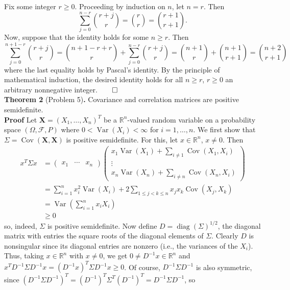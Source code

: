 \documentclass[10pt]{article}
\newcommand{\bs}[1]{\boldsymbol{#1}}
\newcommand{\bp}[1]{\left({#1}\right)}
\newcommand{\mbb}[1]{\mathbb{#1}}
\newcommand{\1}[1]{\mathbbm{1}_{#1}}
\newcommand{\mc}[1]{\mathcal{#1}}
\newcommand{\nck}[2]{{#1\choose#2}}
\DeclareMathOperator{\Var}{Var}
\DeclareMathOperator{\Cov}{Cov}
\DeclareMathOperator{\diag}{diag}
\begin{document}
    \hspace{5pt} Fix some integer $r\geq 0$. Proceeding by induction on $n$, let $n=r$. Then
    \[\sum_{j=0}^{n-r}\nck{r+j}{r}=\nck{r}{r}=\nck{r+1}{r+1}.\]
    Now, suppose that the identity holds for some $n\geq r$. Then
    \[\sum_{j=0}^{n+1-r}\nck{r+j}{r}=\nck{n+1-r+r}{r}+\sum_{j=0}^{n-r}\nck{r+j}{r}=\nck{n+1}{r}+\nck{n+1}{r+1}=\nck{n+2}{r+1}\]
    where the last equality holds by Pascal's identity. By the principle of mathematical induction, the desired identity holds for all $n\geq r$, $r\geq0$ an arbitrary nonnegative integer.\hfill{$\qed$}\\[5pt]
    {\bf Theorem 2} (Problem 5){\bf .} Covariance and correlation matrices are positive semidefinite.\\[5pt]
    {\bf Proof}\hspace{5pt} Let $\bs{X}=(X_1,\dots,X_n)^T$ be a $\mbb{R}^n$-valued random variable on a probability space $(\Omega,\mc{F},P)$ where $0<\Var(X_i)<\infty$ for $i=1,\dots,n$. We first show that $\Sigma=\Cov(\bs{X},\bs{X})$ is positive semidefinite. For this, let $x\in\mbb{R}^n$, $x\neq 0$. Then
    \begin{align*}
        x^T\Sigma x&=\begin{pmatrix}
            x_1 & \cdots & x_n
        \end{pmatrix}
        \begin{pmatrix}
            x_1\Var(X_1)+\sum_{i\neq 1}\Cov(X_1,X_i)\\
            \vdots\\
            x_n\Var(X_n)+\sum_{i\neq n}\Cov(X_n,X_i)
        \end{pmatrix}\\
        &=\sum_{i=1}^nx_i^2\Var(X_i)+2\sum_{1\leq j<k\leq n}x_jx_k\Cov(X_j,X_k)\\
        &=\Var\bp{\sum_{i=1}^nx_iX_i}\\
        &\geq 0
    \end{align*}
    so, indeed, $\Sigma$ is positive semidefinite. Now define $D=\diag(\Sigma)^{1/2}$, the diagonal matrix with entries the square roots of the diagonal elements of $\Sigma$. Clearly $D$ is nonsingular since its diagonal entries are nonzero (i.e., the variances of the $X_i$).
    Thus, taking $x\in\mbb{R}^n$ with $x\neq 0$, we get $0\neq D^{-1}x\in\mbb{R}^n$ and $x^TD^{-1}\Sigma D^{-1}x=(D^{-1}x)^T\Sigma D^{-1}x\geq 0$. Of course, $D^{-1}\Sigma D^{-1}$ is also symmetric, since $(D^{-1}\Sigma D^{-1})^T=(D^{-1})^T\Sigma^T (D^{-1})^T=D^{-1}\Sigma D^{-1}$, so 
\end{document}
